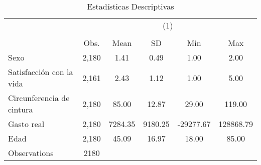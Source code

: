 \begin{table}[htbp]\centering
\def\sym#1{\ifmmode^{#1}\else\(^{#1}\)\fi}
\caption{Estadísticas Descriptivas}
\begin{tabular}{l*{1}{ccccc}}
\hline\hline
                    &\multicolumn{5}{c}{(1)}                                         \\
                    &\multicolumn{5}{c}{}                                            \\
                    &        Obs.&        Mean&          SD&         Min&         Max\\
\hline
Sexo                &       2,180&        1.41&        0.49&        1.00&        2.00\\
Satisfacción con la vida&       2,161&        2.43&        1.12&        1.00&        5.00\\
Circunferencia de cintura&       2,180&       85.00&       12.87&       29.00&      119.00\\
Gasto real          &       2,180&     7284.35&     9180.25&   -29277.67&   128868.79\\
Edad                &       2,180&       45.09&       16.97&       18.00&       85.00\\
\hline
Observations        &        2180&            &            &            &            \\
\hline\hline
\end{tabular}
\end{table}

